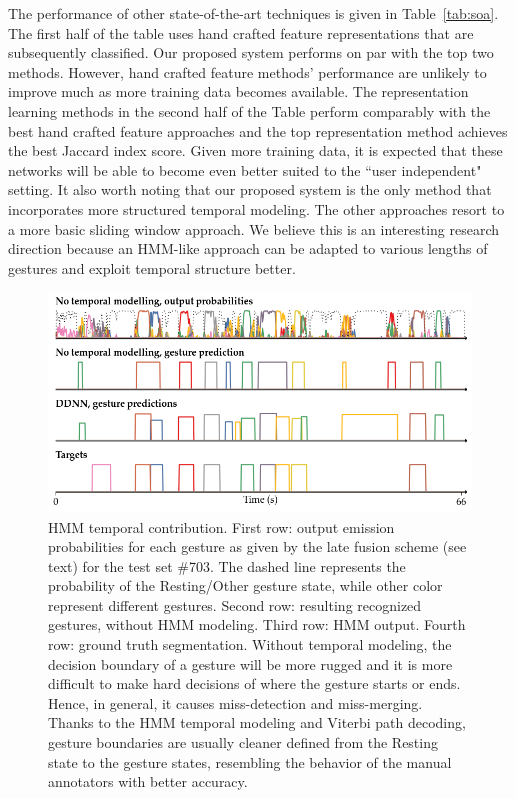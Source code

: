 The performance of other state-of-the-art techniques is given in Table~\ref{tab:soa}. The first half of the table uses hand crafted feature representations that are subsequently classified. Our proposed system performs on par with the top two methods. However, hand crafted feature methods' performance are unlikely to improve much as more training data becomes available. The representation learning methods in the second half of the Table perform comparably with the best hand crafted feature approaches and the top representation method achieves the best Jaccard index score. Given more training data, it is expected that these networks will be able to become even better suited to the ``user independent" setting. It also worth noting that our proposed system is the only method that incorporates more structured temporal modeling. The other approaches resort to a more basic sliding window approach. We believe this is an interesting research direction because an HMM-like approach can be adapted to various lengths of gestures and exploit temporal structure better.

%


\begin{figure}[t]
  \centering
  \includegraphics[width=.7\textwidth]{images/output.png}
  \caption{
  \small{HMM temporal contribution.
First row: output emission probabilities for each gesture as given by the late fusion scheme (see text) for the test set \#703.
The dashed line represents the probability of the Resting/Other gesture state,
while other color represent different gestures.
Second row: resulting recognized gestures, without HMM modeling.
Third row: HMM output.
Fourth row: ground truth segmentation.
%
Without temporal modeling, the decision boundary of a gesture will be more rugged and it is more difficult to make
hard decisions of where the gesture starts or ends. Hence, in general,
it causes miss-detection and miss-merging.
%
Thanks to the HMM temporal modeling and Viterbi path decoding, gesture boundaries
are usually cleaner defined from the Resting state to the gesture states,
resembling the behavior of the manual annotators with better accuracy.
}
}
    \label{fig:temporalModellingComparision}
\end{figure}

